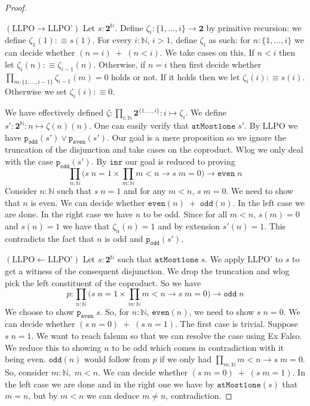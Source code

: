 \documentclass[12pt]{report}
\begin{document}
\begin{proof}~

$(\text{LLPO} \rightarrow \text{LLPO'})$ Let $s : \mathbf{2}^\mathbb{N}$. 
Define $\zeta_i : \{1,\ldots,i\} \rightarrow \mathbf{2}$ by primitive recursion: we define $\zeta_1 (1) :\equiv s(1)$. 
For every $i : \mathbb{N}$, $i  >1$, define $\zeta_i$ as such: for $n : \{ 1,\ldots,i \}$ we can decide whether $(n=i)\;+\;(n < i)$. 
We take cases on this. 
If $n < i$ then let $\zeta_i(n) : \equiv \zeta_{i-1}(n)$. 
Otherwise, if $n = i$ then first decide whether $\prod_{m : \{1,\ldots,i-1\}}\zeta_{i-1}(m) = 0$ holds or not. 
If it holds then we let $\zeta_{i}(i) :\equiv s(i)$. 
Otherwise we set $\zeta_i(i) : \equiv 0$. 

We have effectively defined $\zeta : \prod_{i : \mathbb{N}} \mathbf{2}^{\{ 1,\ldots,i \}} : i \mapsto \zeta_i$. 
We define $s' : \mathbf{2}^\mathbb{N} : n \mapsto \zeta(n)(n)$. 
One can easily verify that $\mathtt{atMost1one}\; s'$. 
By LLPO we have $\mathtt{p_{odd}}(s') \vee \mathtt{p_{even}}(s')$. 
Our goal is a mere proposition so we ignore the truncation of the disjunction and take cases on the coproduct. 
Wlog we only deal with the case $\mathtt{p_{odd}}(s')$. 
By $\mathtt{inr}$ our goal is reduced to proving
$$\prod_{n : \mathbb{N}} \big( s\;n = 1 \times \prod_{m : \mathbb{N}} m < n \rightarrow s\;m=0 \big) \rightarrow \mathtt{even}\;n$$
Consider $n : \mathbb{N}$ such that $s\;n = 1$ and for any $m < n$, $s\;m=0$. 
We need to show that $n$ is even. 
We can decide whether $\mathtt{even}(n)\; +\;\mathtt{odd}(n) $. 
In the left case we are done. 
In the right case we have $n$ to be odd. 
Since for all $m < n$, $s(m) = 0$ and $s(n) =1$ we have that $\zeta_n(n) = 1$ and by extension $s'(n) = 1$. 
This contradicts the fact that $n$ is odd and $\mathtt{p_{odd}}(s')$. 

$(\text{LLPO} \leftarrow \text{LLPO'})$ Let $s : \mathbf{2}^\mathbb{N}$ such that $\mathtt{atMost1one}\; s$. 
We apply LLPO' to $s$ to get a witness of the consequent disjunction. 
We drop the truncation and wlog pick the left constituent of the coproduct. 
So we have 
$$p : \prod_{n : \mathbb{N}} \big( s\;n = 1 \times \prod_{m : \mathbb{N}} m < n \rightarrow s\;m=0 \big) \rightarrow \mathtt{odd}\;n$$
We choose to show $\mathtt{p_{even}}\; s$. 
So, for $n : \mathbb{N}$, $\mathtt{even}(n)$, we need to show $s\; n = 0$. 
We can decide whether $(s\;n= 0)\;+\;(s\;n = 1)$. 
The first case is trivial. 
Suppose $s\;n = 1$. 
We want to reach falsum so that we can resolve the case using Ex Falso. 
We reduce this to showing $n$ to be odd which comes in contradiction with it being even. 
$\mathtt{odd}(n)$ would follow from $p$ if we only had $\prod_{m : \mathbb{N}}m < n \rightarrow s\;m = 0$. 
So, consider $m : \mathbb{N},\;m < n$. 
We can decide whether $(s\;m = 0)\;+\;(s\;m = 1)$. 
In the left case we are done and in the right one we have by $\mathtt{atMost1one}(s)$ that $m = n$, but by $m< n$ we can deduce $m\neq n$, contradiction.
\end{proof}
\end{document}
